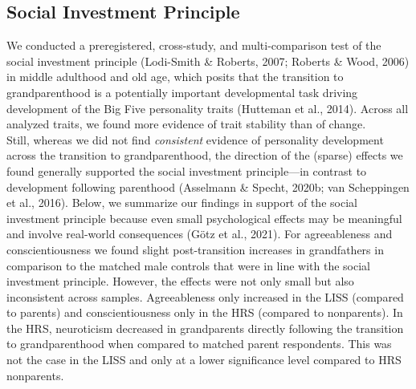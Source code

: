 \documentclass[
  english,
  man,floatsintext]{apa7}
\begin{document}
\hypertarget{social-investment-principle}{%
\subsection{Social Investment Principle}\label{social-investment-principle}}

We conducted a preregistered, cross-study, and multi-comparison test of the social investment principle (Lodi-Smith \& Roberts, 2007; Roberts \& Wood, 2006) in middle adulthood and old age, which posits that the transition to grandparenthood is a potentially important developmental task driving development of the Big Five personality traits (Hutteman et al., 2014). Across all analyzed traits, we found more evidence of trait stability than of change.\\
Still, whereas we did not find \emph{consistent} evidence of personality development across the transition to grandparenthood, the direction of the (sparse) effects we found generally supported the social investment principle---in contrast to development following parenthood (Asselmann \& Specht, 2020b; van Scheppingen et al., 2016). Below, we summarize our findings in support of the social investment principle because even small psychological effects may be meaningful and involve real-world consequences (Götz et al., 2021). For agreeableness and conscientiousness we found slight post-transition increases in grandfathers in comparison to the matched male controls that were in line with the social investment principle. However, the effects were not only small but also inconsistent across samples. Agreeableness only increased in the LISS (compared to parents) and conscientiousness only in the HRS (compared to nonparents). In the HRS, neuroticism decreased in grandparents directly following the transition to grandparenthood when compared to matched parent respondents. This was not the case in the LISS and only at a lower significance level compared to HRS nonparents.\\
\end{document}
